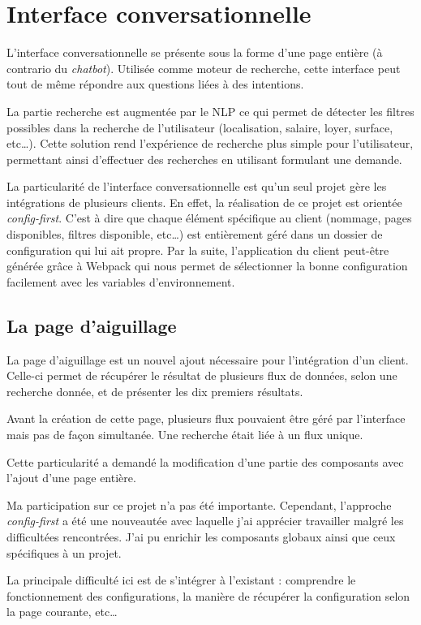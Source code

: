 \documentclass[12pt,a4paper,oneside]{scrreprt}
\begin{document}
\section{Interface conversationnelle}

L'interface conversationnelle se présente sous la forme d'une page entière (à contrario du \textit{chatbot}). Utilisée comme moteur de recherche, cette interface peut tout de même répondre aux questions liées à des intentions.

La partie recherche est augmentée par le NLP ce qui permet de détecter les filtres possibles dans la recherche de l'utilisateur (localisation, salaire, loyer, surface, etc\dots). Cette solution rend l'expérience de recherche plus simple pour l'utilisateur, permettant ainsi d'effectuer des recherches en utilisant formulant une demande.

La particularité de l'interface conversationnelle est qu'un seul projet gère les intégrations de plusieurs clients. En effet, la réalisation de ce projet est orientée \textit{config-first}. C'est à dire que chaque élément spécifique au client (nommage, pages disponibles, filtres disponible, etc\dots) est entièrement géré dans un dossier de configuration qui lui ait propre. Par la suite, l'application du client peut-être générée grâce à Webpack qui nous permet de sélectionner la bonne configuration facilement avec les variables d'environnement.

\subsection{La page d'aiguillage}

La page d'aiguillage est un nouvel ajout nécessaire pour l'intégration d'un client. Celle-ci permet de récupérer le résultat de plusieurs flux de données, selon une recherche donnée, et de présenter les dix premiers résultats.

Avant la création de cette page, plusieurs flux pouvaient être géré par l'interface mais pas de façon simultanée. Une recherche était liée à un flux unique.

Cette particularité a demandé la modification d'une partie des composants avec l'ajout d'une page entière.

\begin{info}
	Ma participation sur ce projet n'a pas été importante. Cependant, l'approche \textit{config-first} a été une nouveautée avec laquelle j'ai apprécier travailler malgré les difficultées rencontrées. J'ai pu enrichir les composants globaux ainsi que ceux spécifiques à un projet.

	La principale difficulté ici est de s'intégrer à l'existant : comprendre le fonctionnement des configurations, la manière de récupérer la configuration selon la page courante, etc\dots
\end{info}
\end{document}
